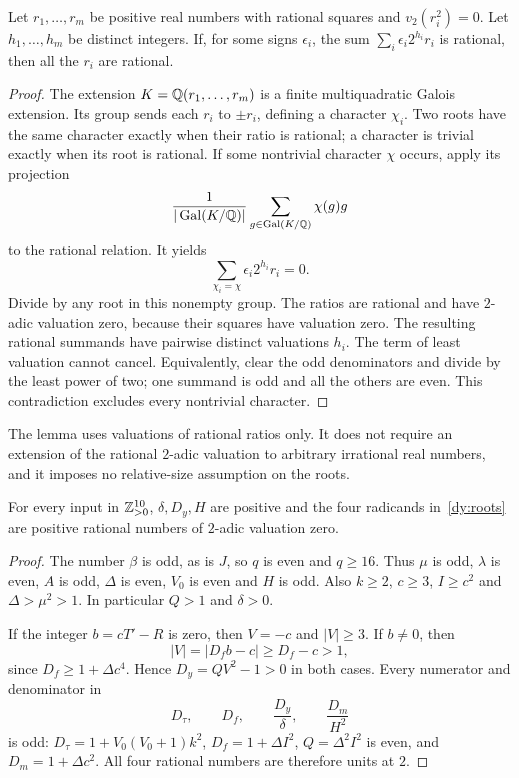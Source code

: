 \begin{lemma}
\label{dy:dyadic}
Let $r_1,\ldots,r_m$ be positive real numbers with rational squares and
$v_2(r_i^2)=0$.  Let $h_1,\ldots,h_m$ be distinct integers.  If, for some
signs $\epsilon_i$, the sum
$\sum_i\epsilon_i2^{h_i}r_i$ is rational, then all the $r_i$ are rational.
\end{lemma}

\begin{proof}
The extension $K=\mathbb Q(r_1,\ldots,r_m)$ is a finite multiquadratic Galois
extension.  Its group sends each $r_i$ to $\pm r_i$, defining a character
$\chi_i$.  Two roots have the same character exactly when their ratio is
rational; a character is trivial exactly when its root is rational.
If some nontrivial character $\chi$ occurs, apply its projection
\[
  \frac1{|\operatorname{Gal}(K/\mathbb Q)|}
  \sum_{g\in\operatorname{Gal}(K/\mathbb Q)}\chi(g)g
\]
to the rational relation.  It yields
\[
 \sum_{\chi_i=\chi}\epsilon_i2^{h_i}r_i=0.
\]
Divide by any root in this nonempty group.  The ratios are rational and
have $2$-adic valuation zero, because their squares have valuation zero.
The resulting rational summands have pairwise distinct valuations $h_i$.
The term of least valuation cannot cancel.  Equivalently, clear the odd
denominators and divide by the least power of two; one summand is odd and
all the others are even.  This contradiction excludes every nontrivial
character.
\end{proof}

The lemma uses valuations of rational ratios only.  It does not require
an extension of the rational $2$-adic valuation to arbitrary irrational
real numbers, and it imposes no relative-size assumption on the roots.

\begin{lemma}
\label{dy:allinput}
For every input in $\mathbb Z_{>0}^{10}$, $\delta,D_y,H$ are positive and the four
radicands in~\eqref{dy:roots} are positive rational numbers of $2$-adic
valuation zero.
\end{lemma}

\begin{proof}
The number $\beta$ is odd, as is $J$, so $q$ is even and $q\ge16$.
Thus $\mu$ is odd, $\lambda$ is even, $A$ is odd, $\Delta$ is even,
$V_0$ is even and $H$ is odd.  Also $k\ge2$, $c\ge3$, $I\ge c^2$ and
$\Delta>\mu^2>1$.  In particular $Q>1$ and $\delta>0$.

If the integer $b=cT'-R$ is zero, then $V=-c$ and $|V|\ge3$.
If $b\ne0$, then
\[
 |V|=|D_fb-c|\ge D_f-c>1,
\]
since $D_f\ge1+\Delta c^4$.  Hence $D_y=QV^2-1>0$ in both cases.
Every numerator and denominator in
\[
 D_\tau,\qquad D_f,\qquad \frac{D_y}{\delta},\qquad
 \frac{D_m}{H^2}
\]
is odd: $D_\tau=1+V_0(V_0+1)k^2$, $D_f=1+\Delta I^2$,
$Q=\Delta^2I^2$ is even, and $D_m=1+\Delta c^2$.
All four rational numbers are therefore units at $2$.
\end{proof}

